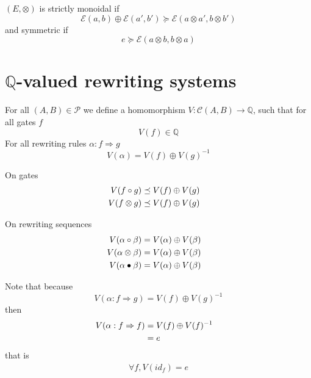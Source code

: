 \documentclass[a4paper]{article}
\begin{document}
\begin{definition}
$(E, \otimes)$ is strictly monoidal if
\[
\mathcal{E}(a, b) \oplus \mathcal{E}(a', b') \succeq \mathcal{E}(a \otimes a',
  b \otimes b')
\]
and symmetric if
\[
e \succeq \mathcal{E}(a \otimes b, b \otimes a)
\]
\end{definition}



\section{$\mathbb{Q}$-valued rewriting systems}

\begin{definition}
For all $(A, B) \in \mathcal{P}$ we define a homomorphism $V: \mathcal{C}(A, B)
  \to \mathbb{Q}$, such that for all gates $f$
\[
V(f) \in \mathbb{Q}
\]
For all rewriting rules $\alpha: f \Rightarrow g$
\[
V(\alpha) = V(f) \oplus V(g)^{-1}
\]

On gates
\begin{align}
V(f \circ g) &\preceq V(f) \oplus V(g) \cr
V(f \otimes g) &\preceq V(f) \oplus V(g)
\end{align}

On rewriting sequences
\begin{align}
V(\alpha \circ \beta) &= V(\alpha) \oplus V(\beta) \cr
V(\alpha \otimes \beta) &= V(\alpha) \oplus V(\beta) \cr
V(\alpha \bullet \beta) &= V(\alpha) \oplus V(\beta)
\end{align}
\end{definition}

\begin{remark}
Note that because
\[
V(\alpha: f \Rightarrow g) = V(f) \oplus V(g)^{-1}
\]
then
\begin{align}
V(\alpha: f \Rightarrow f) &= V(f) \oplus V(f)^{-1} \cr
&= e
\end{align}
that is
\begin{align}
\forall f, V(id_f) = e
\end{align}
\end{remark}
\end{document}
